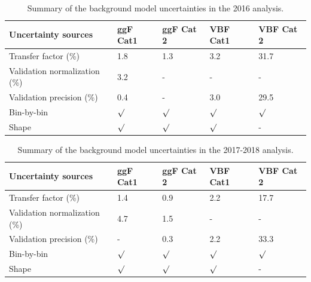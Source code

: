 \begin{table}[ht!]
\centering
\caption[Summary of the background model uncertainties in the 2016 analysis]{\label{syst:bkg2016}Summary of the background model uncertainties in the 2016 analysis.}
\begin{tabularx}{\textwidth}{l X X X X}
    \hline
    Uncertainty sources           & ggF Cat1 & ggF Cat 2 & VBF Cat1 &  VBF Cat 2\\   
    \hline
    Transfer factor (\%)          &  1.8     &      1.3  &  3.2     &    31.7   \\
    Validation normalization (\%) &  3.2     &       -   &   -      &     -     \\
    Validation precision (\%)     &  0.4     &       -   &  3.0     &   29.5    \\
    Bin-by-bin                    & $\surd$  &  $\surd$  & $\surd$  &  $\surd$  \\
    Shape                         & $\surd$  &  $\surd$  & $\surd$  &   -       \\
    \hline
\end{tabularx}
\end{table}

\begin{table}[ht!]
\caption[Summary of the background model uncertainties in the 2017-2018 analysis]{\label{syst:bkg20172018}Summary of the background model uncertainties in the 2017-2018 analysis.}
\centering
\begin{tabularx}{\textwidth}{l X X X X}
    \hline
    Uncertainty sources           & ggF Cat1 & ggF Cat 2 & VBF Cat1 &  VBF Cat 2\\   
    \hline
    Transfer factor (\%)          &  1.4     &      0.9  &  2.2     &    17.7   \\
    Validation normalization (\%) &  4.7     &      1.5  &   -      &     -     \\
    Validation precision (\%)     &   -      &      0.3  &  2.2     &   33.3    \\
    Bin-by-bin                    & $\surd$  &  $\surd$  & $\surd$  &  $\surd$  \\
    Shape                         & $\surd$  &  $\surd$  & $\surd$  &     -     \\
    \hline
\end{tabularx}
\end{table}

